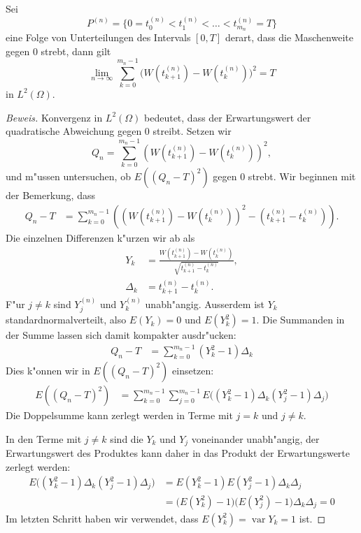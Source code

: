 \begin{hilfssatz}
\label{stochastisch:quadrvariation}
Sei
\[
P^{(n)}
=\{0=t_0^{(n)}<t_1^{(n)}<\dots < t_{m_n}^{(n)}=T\}
\]
eine Folge von Unterteilungen des Intervals $[0,T]$ derart,
dass die Maschenweite gegen $0$ strebt, dann gilt
\[
\lim_{n\to\infty}
\sum_{k=0}^{m_n-1} \bigl(W(t_{k+1}^{(n)})-W(t_{k}^{(n)})\bigr)^2
=T
\]
in $L^2(\Omega)$.
\end{hilfssatz}

\begin{proof}[Beweis]
Konvergenz in $L^2(\Omega)$ bedeutet, dass der Erwartungswert der
quadratische Abweichung gegen $0$ streibt.
Setzen wir
\[
Q_n = 
\sum_{k=0}^{m_n-1} \left(W(t_{k+1}^{(n)})-W(t_{k}^{(n)})\right)^2,
\]
und m"ussen untersuchen, ob $E((Q_n - T)^2)$ gegen $0$ strebt.
Wir beginnen mit der Bemerkung, dass
\begin{align*}
Q_n-T
&=
\sum_{k=0}^{m_n-1}
\left((W(t_{k+1}^{(n)})-W(t_{k}^{(n)}))^2 - (t_{k+1}^{(n)}-t_k^{(n)})\right).
\end{align*}
Die einzelnen Differenzen k"urzen wir ab als
\begin{align*}
Y_k
&=
\frac{W(t_{k+1}^{(n)})-W(t_k^{(n)})}{\sqrt{t_{k+1}^{(n)}-t_{k}^{(n)}}},
\\
\Delta_k
&=
t_{k+1}^{(n)}-t_k^{(n)}.
\end{align*}
F"ur $j\ne k$ sind $Y_j^{(n)}$ und $Y_{k}^{(n)}$ unabh"angig.
Ausserdem ist $Y_k$ standardnormalverteilt, also $E(Y_k)=0$
und $E(Y_k^2)=1$.
Die Summanden in der Summe lassen sich damit kompakter ausdr"ucken:
\begin{align*}
Q_n-T
&=
\sum_{k=0}^{m_n-1} (Y_k^2-1) \Delta_k
\end{align*}
Dies k"onnen wir in $E((Q_n-T)^2)$ einsetzen:
\begin{align*}
E((Q_n-T)^2)
&=
\sum_{k=0}^{m_n-1}
\sum_{j=0}^{m_n-1}
E\biggl(
(Y_k^2-1)\Delta_k
(Y_j^2-1)\Delta_j
\biggr)
\end{align*}
Die Doppelsumme kann zerlegt werden in Terme mit $j=k$ und $j\ne k$.

In den Terme mit $j\ne k$ sind die $Y_k$ und $Y_j$ voneinander unabh"angig,
der Erwartungswert des Produktes kann daher in das Produkt der Erwartungswerte
zerlegt werden:
\begin{align*}
E\biggl(
(Y_k^2-1)\Delta_k
(Y_j^2-1)\Delta_j
\biggr)
&=
E(Y_k^2-1)
E(Y_j^2-1)
\Delta_k
\Delta_j
\\
&=
\bigl(E(Y_k^2) -1\bigr)
\bigl(E(Y_j^2) -1\bigr)
\Delta_k
\Delta_j
=0
\end{align*}
Im letzten Schritt haben wir verwendet, dass $E(Y_k^2)=\operatorname{var}Y_k=1$
ist.


\end{proof}
